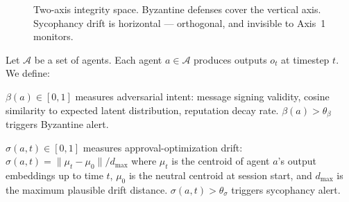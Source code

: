 \documentclass[letterpaper,twocolumn,10pt]{article}
\begin{document}
\begin{figure}[t]
\centering
{}
\caption{Two-axis integrity space. Byzantine defenses cover the vertical axis.
Sycophancy drift is horizontal — orthogonal, and invisible to Axis~1 monitors.}
\label{fig:two-axis}
\end{figure}

Let $\mathcal{A}$ be a set of agents. Each agent $a \in \mathcal{A}$ produces
outputs $o_t$ at timestep $t$. We define:

\begin{definition}
$\beta(a) \in [0,1]$ measures adversarial intent: message signing validity,
cosine similarity to expected latent distribution, reputation decay rate.
$\beta(a) > \theta_\beta$ triggers Byzantine alert.
\end{definition}

\begin{definition}
$\sigma(a, t) \in [0,1]$ measures approval-optimization drift:
$\sigma(a,t) = \lVert \mu_t - \mu_0 \rVert / d_{\max}$
where $\mu_t$ is the centroid of agent $a$'s output embeddings up to time $t$,
$\mu_0$ is the neutral centroid at session start, and $d_{\max}$ is the
maximum plausible drift distance.
$\sigma(a,t) > \theta_\sigma$ triggers sycophancy alert.
\end{definition}
\end{document}
